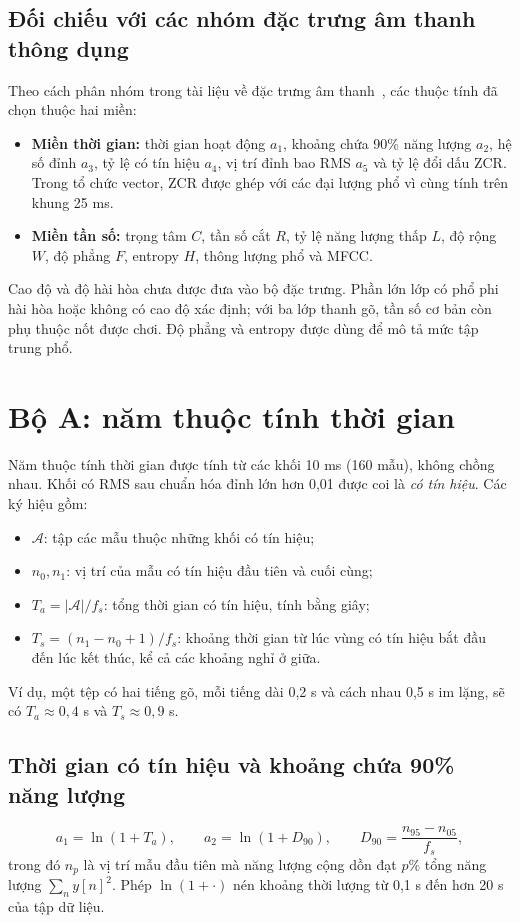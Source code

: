 \documentclass[11pt,a4paper]{article}
\begin{document}
\subsection{Đối chiếu với các nhóm đặc trưng âm thanh thông dụng}
Theo cách phân nhóm trong tài liệu về đặc trưng âm thanh~\cite{peeters}, các thuộc tính đã chọn thuộc hai miền:
\begin{itemize}
\item \textbf{Miền thời gian:} thời gian hoạt động $a_1$, khoảng chứa 90\% năng lượng $a_2$, hệ số đỉnh $a_3$, tỷ lệ có tín hiệu $a_4$, vị trí đỉnh bao RMS $a_5$ và tỷ lệ đổi dấu ZCR. Trong tổ chức vector, ZCR được ghép với các đại lượng phổ vì cùng tính trên khung 25 ms.
\item \textbf{Miền tần số:} trọng tâm $C$, tần số cắt $R$, tỷ lệ năng lượng thấp $L$, độ rộng $W$, độ phẳng $F$, entropy $H$, thông lượng phổ và MFCC.
\end{itemize}
Cao độ và độ hài hòa chưa được đưa vào bộ đặc trưng. Phần lớn lớp có phổ phi hài hòa hoặc không có cao độ xác định; với ba lớp thanh gõ, tần số cơ bản còn phụ thuộc nốt được chơi. Độ phẳng và entropy được dùng để mô tả mức tập trung phổ.

\section{Bộ A: năm thuộc tính thời gian}\label{sec:boA-tg}
Năm thuộc tính thời gian được tính từ các khối 10 ms (160 mẫu), không chồng nhau. Khối có RMS sau chuẩn hóa đỉnh lớn hơn 0,01 được coi là \emph{có tín hiệu}. Các ký hiệu gồm:
\begin{itemize}
\item $\mathcal A$: tập các mẫu thuộc những khối có tín hiệu;
\item $n_0, n_1$: vị trí của mẫu có tín hiệu đầu tiên và cuối cùng;
\item $T_a=|\mathcal A|/f_s$: tổng thời gian có tín hiệu, tính bằng giây;
\item $T_s=(n_1-n_0+1)/f_s$: khoảng thời gian từ lúc vùng có tín hiệu bắt đầu đến lúc kết thúc, kể cả các khoảng nghỉ ở giữa.
\end{itemize}
Ví dụ, một tệp có hai tiếng gõ, mỗi tiếng dài 0,2 s và cách nhau 0,5 s im lặng, sẽ có $T_a\approx0{,}4$ s và $T_s\approx0{,}9$ s.

\subsection{Thời gian có tín hiệu và khoảng chứa 90\% năng lượng}
\[
a_1=\ln(1+T_a),\qquad a_2=\ln(1+D_{90}),\qquad
D_{90}=\frac{n_{95}-n_{05}}{f_s},
\]
trong đó $n_p$ là vị trí mẫu đầu tiên mà năng lượng cộng dồn đạt $p\%$ tổng năng lượng $\sum_n y[n]^2$. Phép $\ln(1+\cdot)$ nén khoảng thời lượng từ 0,1 s đến hơn 20 s của tập dữ liệu.
\end{document}
